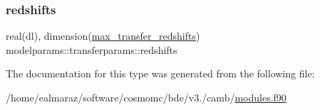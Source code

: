\subsubsection{\texorpdfstring{redshifts}{redshifts}}
{\footnotesize\ttfamily real(dl), dimension(\mbox{\hyperlink{namespacemodelparams_abe7b8d46cfb994afa85d77bbb5b6b5d5}{max\+\_\+transfer\+\_\+redshifts}}) modelparams\+::transferparams\+::redshifts}



The documentation for this type was generated from the following file\+:\begin{DoxyCompactItemize}
\item 
/home/ealmaraz/software/cosmomc/bde/v3./camb/\mbox{\hyperlink{modules_8f90}{modules.\+f90}}\end{DoxyCompactItemize}
